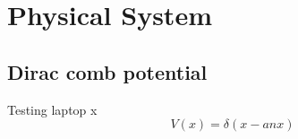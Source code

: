 \chapter{Physical System}\label{ch:system}


\section{Dirac comb potential}

Testing laptop
x
\begin{equation} %
	V(x) = \delta(x-anx)
\end{equation}





